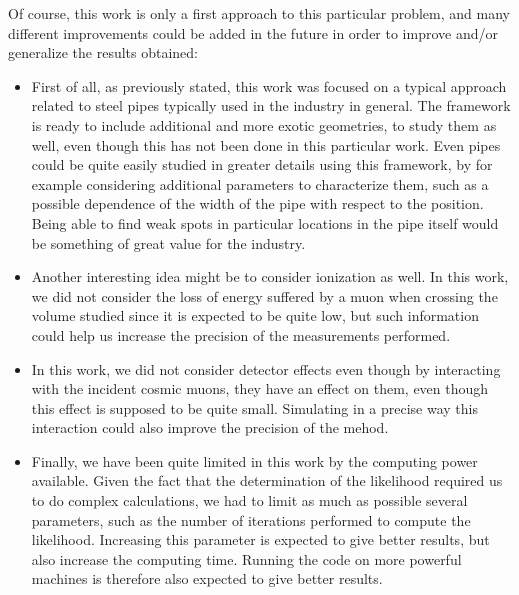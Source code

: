 \documentclass[a4paper, 11pt]{report}
\begin{document}
Of course, this work is only a first approach to this particular problem, and many different improvements could be added in the future in order to improve and/or generalize the results obtained:

\begin{itemize}
    \item First of all, as previously stated, this work was focused on a typical approach related to steel pipes typically used in the industry in general. The framework is ready to include additional and more exotic geometries, to study them as well, even though this has not been done in this particular work. Even pipes could be quite easily studied in greater details using this framework, by for example considering additional parameters to characterize them, such as a possible dependence of the width of the pipe with respect to the position. Being able to find weak spots in particular locations in the pipe itself would be something of great value for the industry.
    \item Another interesting idea might be to consider ionization as well. In this work, we did not consider the loss of energy suffered by a muon when crossing the volume studied since it is expected to be quite low, but such information could help us increase the precision of the measurements performed.
    \item In this work, we did not consider detector effects even though by interacting with the incident cosmic muons, they have an effect on them, even though this effect is supposed to be quite small. Simulating in a precise way this interaction could also improve the precision of the mehod.
    \item Finally, we have been quite limited in this work by the computing power available. Given the fact that the determination of the likelihood required us to do complex calculations, we had to limit as much as possible several parameters, such as the number of iterations performed to compute the likelihood. Increasing this parameter is expected to give better results, but also increase the computing time. Running the code on more powerful machines is therefore also expected to give better results.
\end{itemize}

  
  
\end{document}
